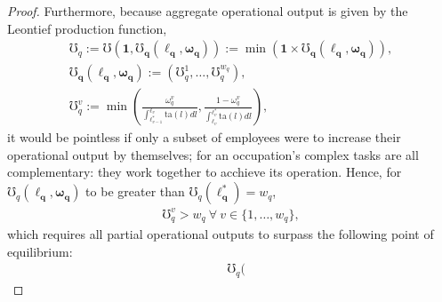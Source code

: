 \documentclass[hidelinks, nonatbib]{elsarticle}
\begin{document}
\begin{lemma}
\begin{proof}
        Furthermore, because aggregate operational output is given by the Leontief production function, 
        \begin{gather}
            \mho_{q}
            :=
            \mho(
                \boldsymbol{1},
                \boldsymbol{\mho_q}(
                    \boldsymbol{\ell_{q}}
                    ,\boldsymbol{\omega_{q}}
                )
            )
            :=
            \min(
                \boldsymbol{1}
                \times
                \boldsymbol{\mho_q}(
                    \boldsymbol{\ell_{q}}
                    ,\boldsymbol{\omega_{q}}
                )
            )
            ,
            \\
            \boldsymbol{\mho_q}(
                \boldsymbol{\ell_{q}}
                ,\boldsymbol{\omega_{q}}
            )
            :=
            (
                \mho_{q}^{1}
                ,
                \dots
                ,
                \mho_{q}^{w_q}
            )
            ,
            \\
            \mho_{q}^{v}
            := 
            \min
            \left(
                    \frac{
                        \omega_{q}^{v}
                    }{
                        \int_{\ell_{v-1}^{*}}^{\ell_v}{
                            \text{ta}(l)dl
                        }
                    }
                    ,
                    \frac{
                        1 - \omega_{q}^{v}
                    }{
                        \int_{\ell_v}^{\ell_{v}^{*}}{
                            \text{ta}(l)dl
                        }
                    }
                \right)
            ,
        \end{gather}
        it would be pointless if only a subset of employees were to increase their operational output by themselves; for an occupation's complex tasks are all complementary: they work together to acchieve its operation. Hence, for $\mho_{q}(
            \boldsymbol{\ell_q}
            ,\boldsymbol{\omega_q}
        )$ to be greater than $
        \mho_{q}(
            \boldsymbol{\ell_{q}^{*}}
        )
        =
        w_q$,
        \begin{gather}
            \mho_{q}^{v} > w_q
            \
            \forall
            \
            v \in \{1, \dots, w_q\}
            ,
        \end{gather}
        which requires all partial operational outputs to surpass the following point of equilibrium:
        \begin{align}
            &\mho_{q}(

\end{align}
\end{proof}
\end{lemma}
\end{document}
